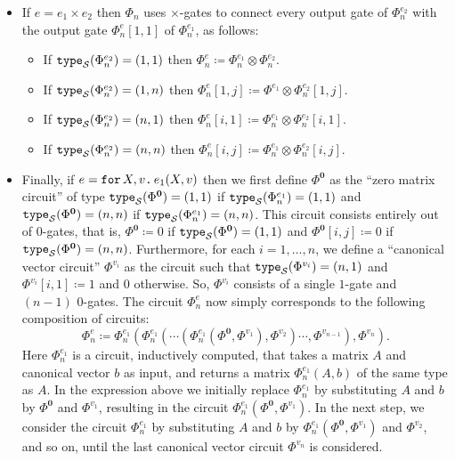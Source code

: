 \begin{itemize}
\begin{itemize}
\end{itemize}
\item If $e=e_1\times e_2$ then $\Phi_n$ uses $\times$-gates to connect every output gate of $\Phi_n^{e_2}$ with the output gate $\Phi^e_n[1,1]$ of $\Phi_n^{e_1}$, as follows:
\begin{itemize}
	\item If $\texttt{type}_{\mathcal{S}}(\Phi^{e_2}_n)=(1, 1)$  then  $\Phi^e_n\coloneqq \Phi^{e_1}_n \otimes \Phi^{e_2}_n$.
  \item If $\texttt{type}_{\mathcal{S}}(\Phi^{e_2}_n)=(1, n)$  then  $\Phi^e_n[1,j]\coloneqq \Phi^{e_1} \otimes \Phi^{e_2}_n[1,j]$.
  \item If $\texttt{type}_{\mathcal{S}}(\Phi^{e_2}_n)=(n, 1)$  then  $\Phi^e_n[i,1]\coloneqq \Phi^{e_1}_n \otimes \Phi^{e_2}_n[i,1]$.
  \item If $\texttt{type}_{\mathcal{S}}(\Phi^{e_2}_n)=(n, n)$ then $\Phi^e_n[i,j]\coloneqq \Phi^{e_1}_n \otimes \Phi^{e_2}_n[i,j]$.
\end{itemize}

\item Finally, if $e=\texttt{for}\, X,v \texttt{.}\, e_1(X, v)$ then  we first  define $\Phi^{\mathbf{0}}$ 
as the ``zero matrix circuit'' of type  $\texttt{type}_{\mathcal{S}}(\Phi^{\mathbf{0}})=(1,1)$ if $\texttt{type}_{\mathcal{S}}(\Phi^{e_1}_n)=(1,1)$ and 
$\texttt{type}_{\mathcal{S}}(\Phi^{\mathbf{0}})=(n,n)$ if $\texttt{type}_{\mathcal{S}}(\Phi^{e_1}_n)=(n,n)$.  This circuit consists entirely out of $0$-gates,
that is, $\Phi^{\mathbf{0}}\coloneqq 0$ if $\texttt{type}_{\mathcal{S}}(\Phi^{\mathbf{0}})=(1,1)$ and
$\Phi^{\mathbf{0}}[i,j]\coloneqq 0$ if $\texttt{type}_{\mathcal{S}}(\Phi^{\mathbf{0}})=(n,n)$.
Furthermore, for each $i=1,\ldots, n$, we define a ``canonical vector circuit'' $\Phi^{v_i}$ as the circuit such that $\texttt{type}_{\mathcal{S}}(\Phi^{v_i})=(n,1)$ and $\Phi^{v_i}[i,1]\coloneqq 1$ and $0$ otherwise. So, $\Phi^{v_i}$ consists of a single $1$-gate and $(n-1)$ $0$-gates.
The circuit $\Phi_n^e$ now simply corresponds to the following composition of circuits:
$$\Phi^{e}_n\coloneqq \Phi^{e_1}_n\left( \Phi^{e_1}_n \left( \cdots \left( \Phi^{e_1}_n\left( \Phi^{\mathbf{0}}, \Phi^{v_1}\right), \Phi^{v_2}\right)\cdots, \Phi^{v_{n-1}} \right), \Phi^{v_n} \right).$$
Here $\Phi_n^{e_1}$ is a circuit, inductively computed, that takes a matrix $A$ and canonical vector $b$ as input, and returns a matrix $\Phi_n^{e_1}(A,b)$ of the same type as $A$. In the expression above we initially replace $\Phi_n^{e_1}$ by substituting $A$ and $b$ by $\Phi^{\mathbf{0}}$ and $\Phi^{v_1}$, resulting in the circuit 
$\Phi_n^{e_1}(\Phi^{\mathbf{0}},\Phi^{v_1})$. In the next step, we consider the circuit $\Phi_n^{e_1}$ by substituting $A$ and $b$ by $\Phi_n^{e_1}(\Phi^{\mathbf{0}},\Phi^{v_1})$ and 
$\Phi^{v_2}$, and so on, until the last canonical vector circuit $\Phi^{v_n}$ is considered.
\end{itemize}


